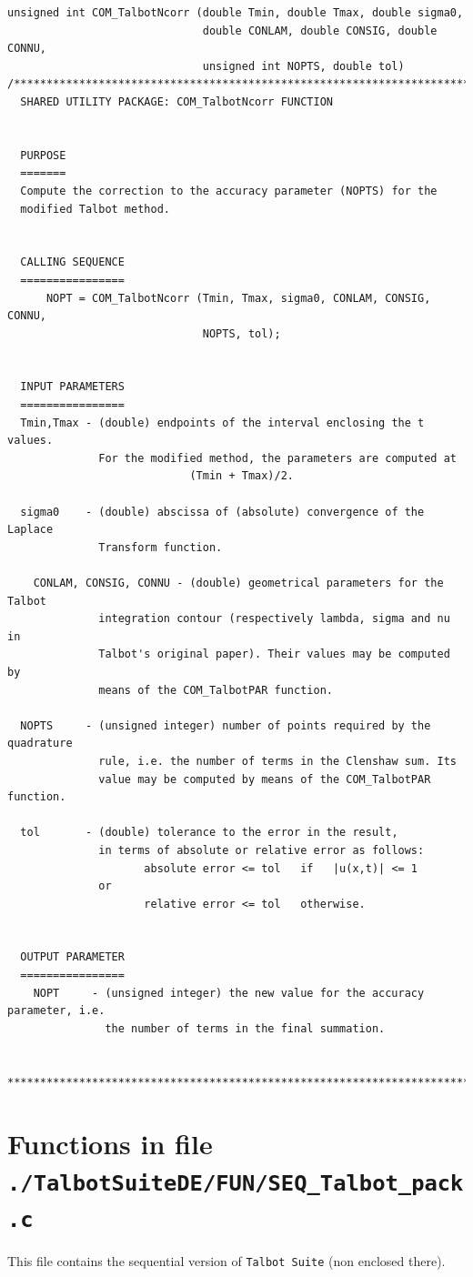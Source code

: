 \documentclass[a4paper,10pt]{report}%
\begin{document}
\begin{lstlisting}
unsigned int COM_TalbotNcorr (double Tmin, double Tmax, double sigma0,
                              double CONLAM, double CONSIG, double CONNU,
                              unsigned int NOPTS, double tol)
/*****************************************************************************
  SHARED UTILITY PACKAGE: COM_TalbotNcorr FUNCTION


  PURPOSE
  =======
  Compute the correction to the accuracy parameter (NOPTS) for the
  modified Talbot method.


  CALLING SEQUENCE
  ================
      NOPT = COM_TalbotNcorr (Tmin, Tmax, sigma0, CONLAM, CONSIG, CONNU,
                              NOPTS, tol);


  INPUT PARAMETERS
  ================
  Tmin,Tmax - (double) endpoints of the interval enclosing the t values.
              For the modified method, the parameters are computed at
							(Tmin + Tmax)/2.
	
  sigma0    - (double) abscissa of (absolute) convergence of the Laplace
              Transform function.
	
	CONLAM, CONSIG, CONNU - (double) geometrical parameters for the Talbot
              integration contour (respectively lambda, sigma and nu in
              Talbot's original paper). Their values may be computed by
              means of the COM_TalbotPAR function.

  NOPTS     - (unsigned integer) number of points required by the quadrature
              rule, i.e. the number of terms in the Clenshaw sum. Its
              value may be computed by means of the COM_TalbotPAR function.

  tol       - (double) tolerance to the error in the result,
              in terms of absolute or relative error as follows:
                     absolute error <= tol   if   |u(x,t)| <= 1
              or
                     relative error <= tol   otherwise.


  OUTPUT PARAMETER
  ================
	NOPT     - (unsigned integer) the new value for the accuracy parameter, i.e.
	           the number of terms in the final summation.

 *****************************************************************************\
\end{lstlisting}



\section{Functions in file {\large\tt ./TalbotSuiteDE/FUN/SEQ\_Talbot\_pack.c}}
This file contains the sequential version of {\tt Talbot Suite} (non enclosed there).
\end{document}
